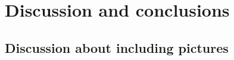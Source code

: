 \chapter{Discussion and conclusions}
\label{chap:conclusion}

\section{Discussion about including pictures}
